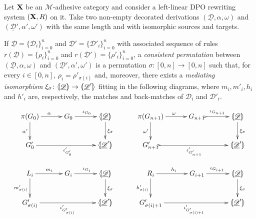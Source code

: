 \documentclass[a4paper,UKenglish,cleveref,pdftex,thm-restate,numberwithinsect,anonymous]{lipics}
\def\R{\mathsf{R}}
\def\X{\textbf {\textup{X}}}
\def\G{\textbf {\textup{G}}}
\newcommand{\dder}[1]{\mathscr{#1}}
\newcommand{\der}[1]{\underline{\dder{#1}}}
\newcommand{\lpro}{\langle \hspace{-1.85pt}[}
\newcommand{\rpro}{]\hspace{-1.85pt}\rangle}
\newcommand{\tpro}[1]{\lpro \der{#1}\rpro}
\begin{document}
\begin{definition}
  \label{def:permcon}
  Let $\X$ be an $\mathcal{M}$-adhesive category and consider a
  left-linear DPO rewriting system $(\X, \R)$ on it.  Take two
  non-empty decorated derivations $(\der{D}, \alpha, \omega)$ and
  $(\der{D}', \alpha', \omega')$ with the same length and with
  isomorphic sources and targets.

  If $\der{D}=\{\dder{D}_i\}_{i=0}^n$ and
  $\der{D}'=\{\dder{D}'_i\}_{i=0}^n$ with associated sequence of rules
  $r(\der{D})=\{\rho_i\}_{i=0}^n$ and
  $r(\der{D}')=\{\rho'_i\}_{i=0}^n$, a \emph{consistent permutation}
  between $(\der{D}, \alpha, \omega)$ and
  $(\der{D}', \alpha', \omega')$ is a permutation
  $\sigma\colon [0,n]\to [0,n]$ such that, for every $i\in [0,n]$,
  $\rho_i=\rho'_{\sigma(i)}$ and, moreover, there exists a
  \emph{mediating isomorphism}
  $\xi_\sigma\colon \tpro{D} \to \lpro \der{D}' \rpro$ fitting in the
  following diagrams, where $m_i, m'_i, h_i$ and $h'_i$ are,
  respectively, the matches and back-matches of $\dder{D}_i$ and
  $\dder{D}'_i$.

  \[
    \xymatrix@C=30pt{\pi(G_0)\ar[r]^{\alpha} \ar[d]_{\alpha'} & G_0
      \ar[r]^{\iota_{G_0}} &\tpro{D} \ar[d]^{\xi_\sigma}& \pi(G_{n+1})
      \ar[r]^{\omega} \ar[d]_{\omega'} & G_{n+1}
      \ar@{>->}[r]^{\iota_{G_{n+1}}} &\tpro{D} \ar[d]^{\xi_\sigma}\\
      G'_0 \ar[rr]_{\iota'_{G'_0}} & &\lpro \der{D}' \rpro& G'_{n+1}
      \ar@{>->}[rr]_{\iota'_{G'_{n+1}}} & &\lpro \der{D}' \rpro\\L_i
      \ar[r]^{m_i} \ar[d]_{m'_{\sigma(i)}}& G_i \ar[r]^{\iota_{G_i}}
      &\tpro{D} \ar[d]^{\xi_\sigma} & R_i \ar[r]^{h_i}
      \ar[d]_{h'_{\sigma(i)}}& G_{i+1} \ar[r]^{\iota_{G_{i+1}}}
      &\tpro{D} \ar[d]^{\xi_\sigma} \\G'_{\sigma(i)}
      \ar[rr]_{\iota'_{G'_{\sigma(i)}}}&& \lpro \der{D}' \rpro&
      G'_{\sigma(i)+1} \ar[rr]_{\iota'_{G'_{\sigma(i)+1}}}&& \lpro
      \der{D}' \rpro}
  \]
\end{definition}
\end{document}
